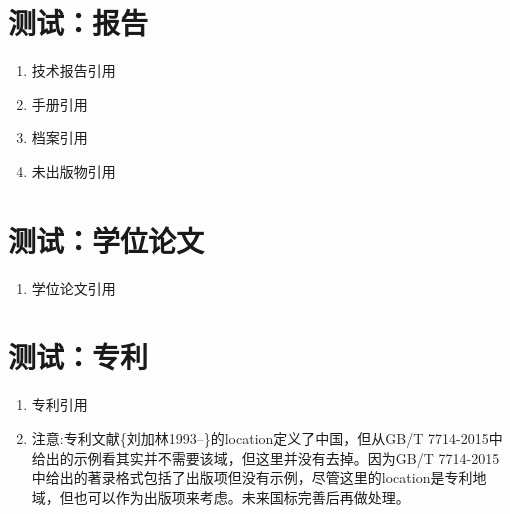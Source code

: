 \section{测试：报告}
\begin{refsection}
\begin{enumerate}
  \item 技术报告引用
  \cite{Calkin2011-8-9,Eggrers--,Humphrey1971--,DTFHA1990--,WHO1970--,汤万金2013-09-30--,中华人民共和国国务院新闻办公室2013-04-16--}
  \item 手册引用
  \cite{Lehman2013--,Lehman2015,Mittelbach2015--,Oetiker2011--,Robertson2011--,Sommerfeldt2011--,Umeki2010--, 胡振震2016,吴凌云2007--}
  \item 档案引用\cite{中国第一历史档案馆2001--}
  \item 未出版物引用\cite{包太雷2013--}
\end{enumerate}

{
\printbibliography%
}
\end{refsection}


\section{测试：学位论文}
\begin{refsection}
\begin{enumerate}
  \item 学位论文引用\cite{CALMS1965--,马欢2011-27-27,吴云芳2003--,张若凌2004--,张志祥1998--}
\end{enumerate}

{
\printbibliography%
}
\end{refsection}


\section{测试：专利}
\begin{refsection}
\begin{enumerate}
  \item 专利引用\cite{KOSEKI2002--,TACHIBANA2002--,河北绿洲生态环境科技有限公司2001--,姜锡洲1989--,刘加林1993--,西安电子科技大学2002--,张凯军2012-04-05--}

  \item 注意:专利文献\{刘加林1993--\}的location定义了中国，但从GB/T 7714-2015中给出的示例看其实并不需要该域，但这里并没有去掉。因为GB/T 7714-2015中给出的著录格式包括了出版项但没有示例，尽管这里的location是专利地域，但也可以作为出版项来考虑。未来国标完善后再做处理。
\end{enumerate}

{
\printbibliography%
}
\end{refsection}

